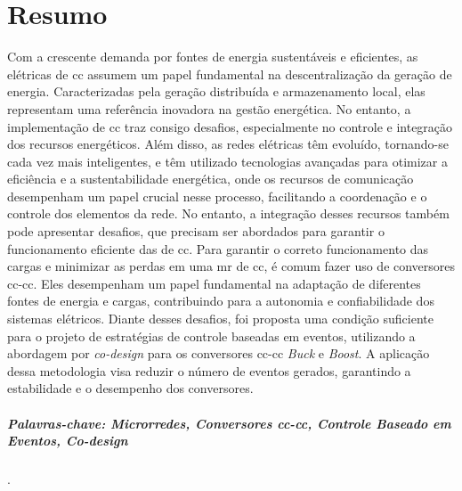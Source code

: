 \chapter*{Resumo}
\thispagestyle{empty}

Com a crescente demanda por fontes de energia sustentáveis e eficientes, as  elétricas de \acrfull{cc} assumem um papel fundamental na descentralização da geração de energia. Caracterizadas pela geração distribuída e armazenamento local, elas representam uma referência inovadora na gestão energética. No entanto, a implementação de  \acrshort{cc} traz consigo desafios, especialmente no controle e integração dos recursos energéticos. Além disso, as redes elétricas têm evoluído, tornando-se cada vez mais inteligentes, e têm utilizado tecnologias avançadas para otimizar a eficiência e a sustentabilidade energética, onde os recursos de comunicação desempenham um papel crucial nesse processo, facilitando a coordenação e o controle dos elementos da rede. No entanto, a integração desses recursos também pode apresentar desafios, que precisam ser abordados para garantir o funcionamento eficiente das  de \acrshort{cc}. Para garantir o correto funcionamento das cargas e minimizar as perdas em uma \acrshort{mr} de \acrshort{cc}, é comum fazer uso de conversores \acrshort{cc}-\acrshort{cc}. Eles desempenham um papel fundamental na adaptação de diferentes fontes de energia e cargas, contribuindo para a autonomia e confiabilidade dos sistemas elétricos. Diante desses desafios, foi proposta uma condição suficiente para o projeto de estratégias de controle baseadas em eventos, utilizando a abordagem por \textit{co-design} para os conversores \acrshort{cc}-\acrshort{cc} \textit{Buck} e \textit{Boost}. A aplicação dessa metodologia visa reduzir o número de eventos gerados, garantindo a estabilidade e o desempenho dos conversores.

\vspace{50pt}

\paragraph{Palavras-chave: Microrredes, Conversores \acrshort{cc}-\acrshort{cc}, Controle Baseado em Eventos, \textit{Co-design}}.

